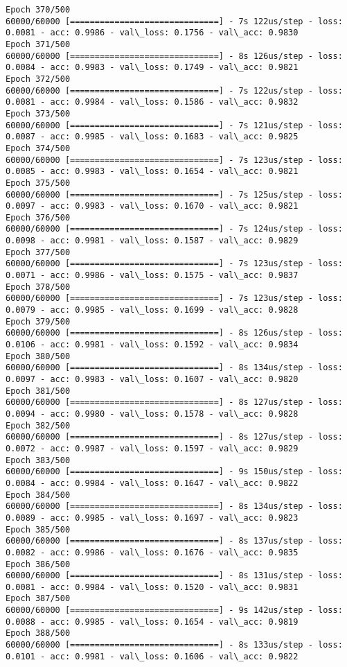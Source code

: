\documentclass[11pt]{article}
\begin{document}
\begin{Verbatim}[commandchars=\\\{\}]
Epoch 370/500
60000/60000 [==============================] - 7s 122us/step - loss: 0.0081 - acc: 0.9986 - val\_loss: 0.1756 - val\_acc: 0.9830
Epoch 371/500
60000/60000 [==============================] - 8s 126us/step - loss: 0.0084 - acc: 0.9983 - val\_loss: 0.1749 - val\_acc: 0.9821
Epoch 372/500
60000/60000 [==============================] - 7s 122us/step - loss: 0.0081 - acc: 0.9984 - val\_loss: 0.1586 - val\_acc: 0.9832
Epoch 373/500
60000/60000 [==============================] - 7s 121us/step - loss: 0.0087 - acc: 0.9985 - val\_loss: 0.1683 - val\_acc: 0.9825
Epoch 374/500
60000/60000 [==============================] - 7s 123us/step - loss: 0.0085 - acc: 0.9983 - val\_loss: 0.1654 - val\_acc: 0.9821
Epoch 375/500
60000/60000 [==============================] - 7s 125us/step - loss: 0.0097 - acc: 0.9983 - val\_loss: 0.1670 - val\_acc: 0.9821
Epoch 376/500
60000/60000 [==============================] - 7s 124us/step - loss: 0.0098 - acc: 0.9981 - val\_loss: 0.1587 - val\_acc: 0.9829
Epoch 377/500
60000/60000 [==============================] - 7s 123us/step - loss: 0.0071 - acc: 0.9986 - val\_loss: 0.1575 - val\_acc: 0.9837
Epoch 378/500
60000/60000 [==============================] - 7s 123us/step - loss: 0.0079 - acc: 0.9985 - val\_loss: 0.1699 - val\_acc: 0.9828
Epoch 379/500
60000/60000 [==============================] - 8s 126us/step - loss: 0.0106 - acc: 0.9981 - val\_loss: 0.1592 - val\_acc: 0.9834
Epoch 380/500
60000/60000 [==============================] - 8s 134us/step - loss: 0.0097 - acc: 0.9983 - val\_loss: 0.1607 - val\_acc: 0.9820
Epoch 381/500
60000/60000 [==============================] - 8s 127us/step - loss: 0.0094 - acc: 0.9980 - val\_loss: 0.1578 - val\_acc: 0.9828
Epoch 382/500
60000/60000 [==============================] - 8s 127us/step - loss: 0.0072 - acc: 0.9987 - val\_loss: 0.1597 - val\_acc: 0.9829
Epoch 383/500
60000/60000 [==============================] - 9s 150us/step - loss: 0.0084 - acc: 0.9984 - val\_loss: 0.1647 - val\_acc: 0.9822
Epoch 384/500
60000/60000 [==============================] - 8s 134us/step - loss: 0.0089 - acc: 0.9985 - val\_loss: 0.1697 - val\_acc: 0.9823
Epoch 385/500
60000/60000 [==============================] - 8s 137us/step - loss: 0.0082 - acc: 0.9986 - val\_loss: 0.1676 - val\_acc: 0.9835
Epoch 386/500
60000/60000 [==============================] - 8s 131us/step - loss: 0.0081 - acc: 0.9984 - val\_loss: 0.1520 - val\_acc: 0.9831
Epoch 387/500
60000/60000 [==============================] - 9s 142us/step - loss: 0.0088 - acc: 0.9985 - val\_loss: 0.1654 - val\_acc: 0.9819
Epoch 388/500
60000/60000 [==============================] - 8s 133us/step - loss: 0.0101 - acc: 0.9981 - val\_loss: 0.1606 - val\_acc: 0.9822

\end{Verbatim}
\end{document}

